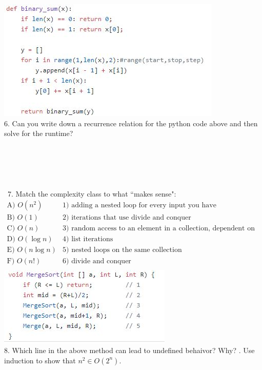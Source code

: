 \documentclass[12pt]{article}
\begin{document}
\noindent \includegraphics[scale = 0.85]{rec.jpg}\\
6. Can you write down a recurrence relation for the python code above and then solve for the runtime?\\\\\\\\\\\\\
7. Match the complexity class to what ``makes sense":
\[
\begin{array}{cc}
 \text{A) $O(n^2)$} & \text{1) adding a nested loop for every input you have} \\
 \text{B) $O(1)$} & \text{2) iterations that use divide and conquer} \\
 \text{C) $O(n)$} & \text{3) random access to an element in a collection, dependent on indexing} \\
 \text{D) $O(\log{n})$} & \text{4) list iterations} \\
 \text{E) $O(n\log{n})$} & \text{5) nested loops on the same collection} \\
 \text{F) $O(n!)$} & \text{6) divide and conquer} \\
\end{array}
\]
\includegraphics{msort.JPG}\\
8. Which line in the above method can lead to undefined behaivor? Why?
\newpage
{}. Use induction to show that $n^2\in O(2^n)$.\\\\\\\\\\\\\\\\\\\\\\\\
\end{document}
